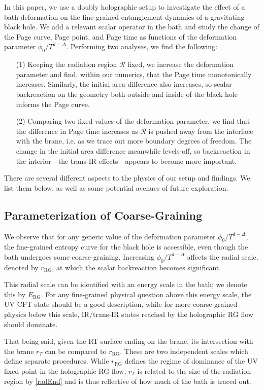 \documentclass[12pt,a4paper]{article}
\begin{document}
In this paper, we use a doubly holographic setup to investigate the effect of a bath deformation on the fine-grained entanglement dynamics of a gravitating black hole. We add a relevant scalar operator in the bath and study the change of the Page curve, Page point, and Page time as functions of the deformation parameter $\phi_0/T^{d-\Delta}$. Performing two analyses, we find the following:
\begin{itemize}
\item[(1)] Keeping the radiation region $\mathcal{R}$ fixed, we increase the deformation parameter and find, within our numerics, that the Page time monotonically increases. Similarly, the initial area difference also increases, so scalar backreaction on the geometry both outside and inside of the black hole informs the Page curve.

\item[(2)] Comparing two fixed values of the deformation parameter, we find that the difference in Page time increases as $\mathcal{R}$ is pushed away from the interface with the brane, i.e. as we trace out more boundary degrees of freedom. The change in the initial area difference meanwhile levels-off, so backreaction in the interior---the trans-IR effects---appears to become more important.
\end{itemize}
There are several different aspects to the physics of our setup and findings. We list them below, as well as some potential avenues of future exploration.

\subsection*{Parameterization of Coarse-Graining}

We observe that for any generic value of the deformation parameter $\phi_0/T^{d-\Delta}$, the fine-grained entropy curve for the black hole is accessible, even though the bath undergoes some coarse-graining. Increasing $\phi_0/T^{d-\Delta}$ affects the radial scale, denoted by $r_\text{RG}$, at which the scalar backreaction becomes significant.

This radial scale can be identified with an energy scale in the bath; we denote this by $E_\text{RG}$. For any fine-grained physical question above this energy scale, the UV CFT state should be a good description, while for more coarse-grained physics below this scale, IR/trans-IR states reached by the holographic RG flow should dominate.

That being said, given the RT surface ending on the brane, its intersection with the brane $r_T$ can be compared to $r_{\text{RG}}$. These are two independent scales which define separate procedures. While $r_{\text{RG}}$ defines the regime of dominance of the UV fixed point in the holographic RG flow, $r_T$ is related to the size of the radiation region by \eqref{radEnd} and is thus reflective of how much of the bath is traced out.
\end{document}
